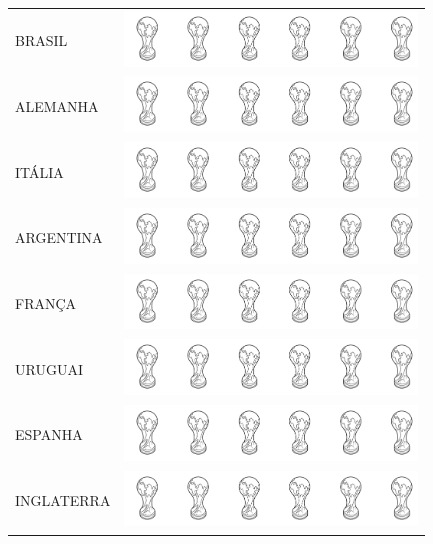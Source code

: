 \begin{longtable}[]{@{}ll@{}}
\toprule
BRASIL &
\includegraphics[width=3.05575in,height=0.58176in]{media/image105.png}\tabularnewline
ALEMANHA &
\includegraphics[width=3.05575in,height=0.58176in]{media/image105.png}\tabularnewline
ITÁLIA &
\includegraphics[width=3.05575in,height=0.58176in]{media/image105.png}\tabularnewline
ARGENTINA &
\includegraphics[width=3.05575in,height=0.58176in]{media/image105.png}\tabularnewline
FRANÇA &
\includegraphics[width=3.05575in,height=0.58176in]{media/image105.png}\tabularnewline
URUGUAI &
\includegraphics[width=3.05575in,height=0.58176in]{media/image105.png}\tabularnewline
ESPANHA &
\includegraphics[width=3.05575in,height=0.58176in]{media/image105.png}\tabularnewline
INGLATERRA &
\includegraphics[width=3.05575in,height=0.58176in]{media/image105.png}\tabularnewline
\bottomrule
\end{longtable}

